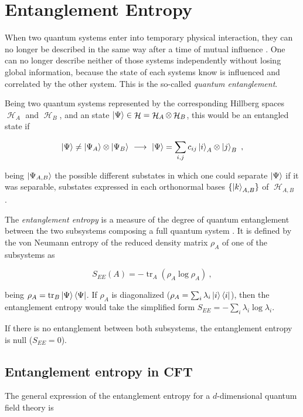 \documentclass[lettersize,journal]{IEEEtran}
\providecommand{\eq}[2]{
    \begin{equation}
        #2
    \label{eq:#1}
    \end{equation}
}
\DeclareMathOperator{\calH}{\mathcal{H}}
\DeclareMathOperator{\tr}{tr}
\begin{document}
\section{Entanglement Entropy} \label{s:EE}

When two quantum systems enter into temporary physical interaction, they can no longer be described in the same way after a time of mutual influence \cite{schrodinger_discussion_1935}. One can no longer describe neither of those systems independently without losing global information, because the state of each systems know is influenced and correlated by the other system. This is the so-called \textit{quantum entanglement}.

Being two quantum systems represented by the corresponding Hillberg spaces $\calH_A$ and $\calH_B$, and an state $\ket{\Psi} \in \calH = \calH_A \otimes \calH_B$, this would be an entangled state if
\eq{entanglement}{
    \ket{\Psi} \neq \ket{\Psi_A} \otimes \ket{\Psi_B} \ \longrightarrow \ \ket{\Psi} = \sum_{i,j} c_{ij} \ket{i}_A \otimes \ket{j}_B \ ,
}
being $\ket{\Psi_{A,B}}$ the possible different substates in which one could separate $\ket{\Psi}$ if it was separable, substates expressed in each orthonormal bases $\{ \ket{k}_{A,B} \}$ of $\calH_{A,B}$ \cite{}.

The \textit{entanglement entropy} is a measure of the degree of quantum entanglement between the two subsystems composing a full quantum system \cite{nishioka_entanglement_2018}. It is defined by the von
Neumann entropy of the reduced density matrix $\rho_A$ of one of the subsystems as
\eq{EE}{
    S_{EE}(A) = - \tr_A ( \rho_A \log \rho_A ) \ ,
}
being $\rho_A = \tr_B \ket{\Psi}\bra{\Psi}$. If $\rho_A$ is diagonalized ($\rho_A = \sum_i \lambda_i \ket{i}\bra{i}$), then the entanglement entropy would take the simplified form $S_{EE} = - \sum_i \lambda_i \log \lambda_i$.

If there is no entanglement between both subsystems, the entanglement entropy is null ($S_{EE} = 0$).


\subsection{Entanglement entropy in CFT} \label{ss:EE_CFT}

The general expression of the entanglement entropy for a $d$-dimensional quantum field theory is
\end{document}
